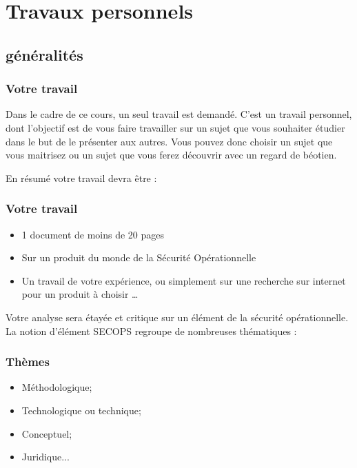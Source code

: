 


\section{Travaux personnels}

\subsection{généralités}

\begin{frame}
\frametitle<presentation>{Votre travail}
Dans le cadre de ce cours, un seul travail  est demandé. C'est un travail personnel, dont l'objectif est de vous faire travailler sur un sujet que vous souhaiter étudier dans le but de le présenter aux autres. Vous pouvez donc choisir un sujet que vous maitrisez ou un sujet que vous ferez découvrir avec un regard de béotien.
\end{frame}

En résumé votre travail devra être : 

\begin{frame}
\frametitle<presentation>{Votre travail}
\begin{itemize}
  \item  1 document de moins de 20 pages
  \item  Sur un produit du monde de la Sécurité Opérationnelle
  \item  Un travail de votre expérience, ou simplement sur une recherche sur internet pour un produit à choisir …
\end{itemize}


\end{frame}

Votre  analyse sera étayée et critique sur un élément de la sécurité opérationnelle. La notion d'élément SECOPS regroupe de nombreuses thématiques :
\begin{frame}
\frametitle<presentation>{Thèmes}
\begin{itemize}
  \item Méthodologique;
  \item Technologique ou technique;
  \item Conceptuel;
  \item Juridique...
\end{itemize}

\end{frame}



